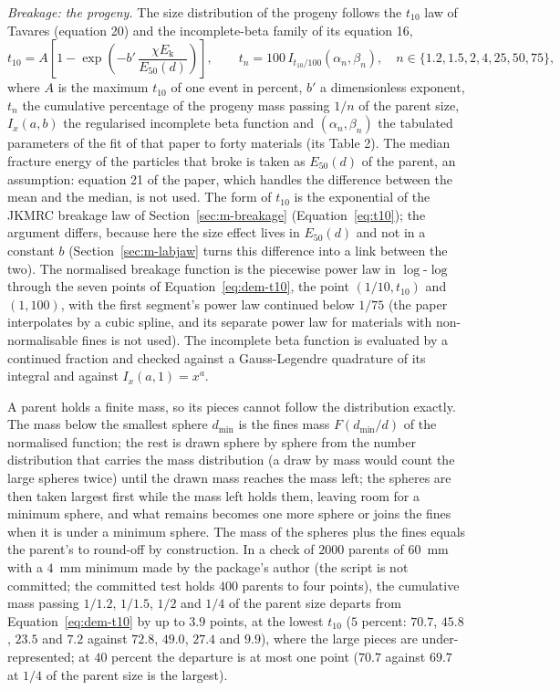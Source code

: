 \emph{Breakage: the progeny.} The size distribution of the progeny follows the $t_{10}$ law of Tavares (equation 20) and the incomplete-beta family of its equation 16,
\begin{equation}
t_{10}=A\left[1-\exp\!\left(-b'\,\frac{\chi E_{\mathrm k}}{E_{50}(d)}\right)\right],\qquad t_n=100\,I_{t_{10}/100}(\alpha_n,\beta_n),\quad n\in\{1.2,1.5,2,4,25,50,75\},
\label{eq:dem-t10}
\end{equation}
where $A$ is the maximum $t_{10}$ of one event in percent, $b'$ a dimensionless exponent, $t_n$ the cumulative percentage of the progeny mass passing $1/n$ of the parent size, $I_x(a,b)$ the regularised incomplete beta function and $(\alpha_n,\beta_n)$ the tabulated parameters of
the fit of that paper to forty materials (its Table 2). The median fracture energy of the particles that broke is taken as $E_{50}(d)$ of the parent, an assumption: equation 21 of the paper, which handles the difference between the mean and the median, is not used. The form of
$t_{10}$ is the exponential of the JKMRC breakage law of Section~\ref{sec:m-breakage} (Equation~\eqref{eq:t10}); the argument differs, because here the size effect lives in $E_{50}(d)$ and not in a constant $b$ (Section~\ref{sec:m-labjaw} turns this difference into a link between the two).
The normalised breakage function is the piecewise power law in $\log$-$\log$ through the seven points of Equation~\eqref{eq:dem-t10}, the point $(1/10,t_{10})$ and $(1,100)$, with the first segment's power law continued below $1/75$ (the paper interpolates by a cubic spline,
and its separate power law for materials with non-normalisable fines is not used). The incomplete beta function is evaluated by a continued fraction and checked against a Gauss-Legendre quadrature of its integral and against $I_x(a,1)=x^a$.

A parent holds a finite mass, so its pieces cannot follow the distribution exactly. The mass below the smallest sphere $d_{\min}$ is the fines mass $F(d_{\min}/d)$ of the normalised function; the rest is drawn sphere by sphere from the number distribution that carries the mass distribution (a draw by mass would count the large
spheres twice) until the drawn mass reaches the mass left; the spheres are then taken largest first while the mass left holds them, leaving room for a minimum sphere, and what remains becomes one more sphere or joins the fines when it is under a minimum sphere. The mass of the spheres plus the fines equals the
parent's to round-off by construction. In a check of $2000$ parents of $60$~mm with a $4$~mm minimum made by the package's author (the script is not committed; the committed test holds $400$ parents to four points), the cumulative mass passing $1/1.2$, $1/1.5$, $1/2$ and $1/4$ of the parent size departs from Equation~\eqref{eq:dem-t10} by up to $3.9$ points, at the lowest $t_{10}$ ($5$ percent: $70.7$, $45.8$, $23.5$ and $7.2$ against $72.8$,
$49.0$, $27.4$ and $9.9$), where the large pieces are under-represented; at $40$ percent the departure is at most one point ($70.7$ against $69.7$ at $1/4$ of the parent size is the largest).

